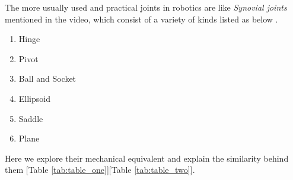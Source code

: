 \documentclass[conference]{IEEEtran}
\begin{document}
The more usually used and practical joints in robotics are like \textit{Synovial joints} mentioned in the video, which consist of a variety of kinds listed as below \cite{b11}. 
\begin{enumerate}
    \item Hinge
    \item Pivot
    \item Ball and Socket
    \item Ellipsoid
    \item Saddle
    \item Plane
\end{enumerate}

Here we explore their mechanical equivalent and explain the similarity behind them [Table \ref{tab:table_one}][Table \ref{tab:table_two}].
{
\setlength{\tabcolsep}{4pt} %
\renewcommand{\arraystretch}{1.5} %

}
\end{document}
